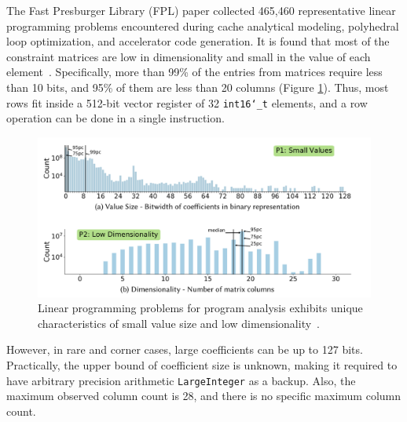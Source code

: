 \documentclass[logo,bsc,singlespacing,parskip]{infthesis}
\newcommand{\dtshort}{\texttt{int16\char`_t}}
\begin{document}
The Fast Presburger Library (FPL) paper collected 465,460 representative linear
programming problems encountered during cache analytical
modeling, polyhedral loop optimization, and accelerator code generation. It is
found that most of the constraint matrices are low in dimensionality and small
in the value of each element~\cite{FPL1}. Specifically, more than 99\% of the
entries from matrices require less than 10 bits, and 95\% of them are less than 20 columns
(Figure \ref{small-val-low-dim}). Thus, most rows fit inside a 512-bit
vector register of 32 \dtshort{} elements, and a row operation can be done in a
single instruction. 


\begin{figure}
    \begin{center}
    \includegraphics[width=\linewidth]{image/small-val-low-dim.png}
    \caption{Linear programming problems for program analysis exhibits unique
    characteristics of small value size and low dimensionality~\cite{FPL1}.}
    \label{small-val-low-dim}
    \end{center}
\end{figure}


However, in rare and corner cases, large coefficients can be up to 127 bits.
Practically, the upper bound of coefficient size is unknown, making it required
to have arbitrary precision arithmetic \texttt{LargeInteger} as a backup. Also,
the maximum observed column count is 28, and there is no specific maximum column
count. 
\end{document}
